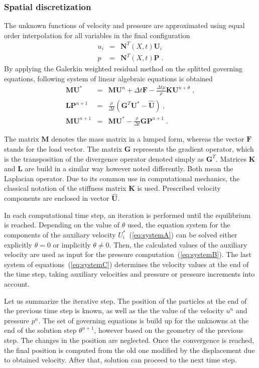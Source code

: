 \documentclass[a4paper]{article}
\newcommand{\mbf}[1]{\boldsymbol{#1}}
\begin{document}
\subsubsection{Spatial discretization}
The unknown functions of velocity and pressure are approximated using equal order interpolation for all variables in the final configuration
\begin{eqnarray}
u_i&=&\mbf{N}^T(X,t)\mbf{U}_i\\
p&=&\mbf{N}^T(X,t)\mbf{P} \;.
\end{eqnarray}
By applying the Galerkin weighted residual method on the splitted governing equations, following system of linear algebraic equations is obtained 
\begin{eqnarray}
\mbf{M}\mbf{U}^* &=& \mbf{M}\mbf{U}^n + \Delta t\mbf{F} - \frac{\Delta t\mu}{\rho}\mbf{K}\mbf{U}^{n+\theta}\;,\label{eq:systemA} \\
\mbf{L}\mbf{P}^{n+1} &=&\frac{\rho}{\Delta t}\left(\mbf{G}^T\mbf{U}^*-\hat{\mbf{U}}\right) \;, \label{eq:systemB} \\
\mbf{M}\mbf{U}^{n+1} &=& \mbf{M}\mbf{U}^* - \frac{\rho}{\Delta t}\mbf{G}\mbf{P}^{n+1} \;.\label{eq:systemC}
\end{eqnarray}
\par
The matrix $\mbf{M}$ denotes the mass matrix in a lumped form, whereas the vector $\mbf{F}$ stands for the load vector. The matrix $\mbf{G}$ represents the gradient operator, which is the transposition of the divergence operator denoted simply as $\mbf{G}^T$. Matrices $\mbf{K}$ and $\mbf{L}$ are build in a similar way however noted differently. Both mean the Laplacian operator. Due to its common use in computational mechanics, the classical notation of the stiffness matrix $\mbf{K}$ is used. Prescribed velocity components are enclosed in vector $\hat{\mbf{U}}$.
\par
In each computational time step, an iteration is performed until the equilibrium is reached. Depending on the value of $\theta$ used, the equation system for the components of the auxiliary velocity $U^*_i$~(\ref{eq:systemA}) can be solved either explicitly $\theta = 0$ or implicitly $\theta \neq 0$. Then, the calculated values of the auxiliary velocity are used as input for the pressure computation~(\ref{eq:systemB}). The last system of equations~(\ref{eq:systemC}) determines the velocity values at the end of the time step, taking auxiliary velocities and pressure or pressure increments into account.
\par
Let us summarize the iterative step. The position of the particles at the end of the previous time step is known, as well as the the value of the velocity $u^n$ and pressure $p^n$. The set of governing equations is build up for the unknowns at the end of the solution step $\theta^{n+1}$, however based on the geometry of the previous step. The changes in the position are neglected. Once the convergence is reached, the final position is computed from the old one modified by the displacement due to obtained velocity. After that, solution can proceed to the next time step.
\end{document}
